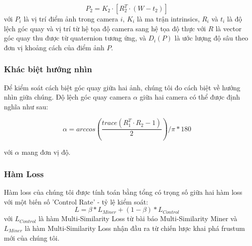 $$
P_2 = K_2 \cdot\left[R_2^{T} \cdot (W - t_2)\right]
$$
với $P_i$ là vị trí điểm ảnh trong camera $i$, $K_i$ là ma trận intrinsics, $R_i$ và $t_i$ là độ lệch góc quay và vị trí từ hệ tọa độ camera sang hệ tọa độ thực với $R$ là vector góc quay thu được từ quaternion tương ứng, và $D_i(P)$ là ước lượng độ sâu theo đơn vị khoảng cách của điểm ảnh $P$.

\subsubsection*{Khác biệt hướng nhìn}

Để kiểm soát cách biệt góc quay giữa hai ảnh, chúng tôi đo cách biệt về hướng nhìn giữa chúng. Độ lệch góc quay camera $\alpha$ giữa hai camera có thể được định nghĩa như sau:

$$
\alpha = arccos\left(\frac{trace(R_1^T \cdot R_2 - 1)}{2} \right) / \pi * 180
$$

với $\alpha$ mang đơn vị độ.

\subsubsection*{Hàm Loss}

Hàm loss của chúng tôi được tính toán bằng tổng có trọng số giữa hai hàm loss với một biến số 'Control Rate' - tỷ lệ kiểm soát:
$$
L = \beta * L_{Miner} + (1-\beta)*L_{Control}
$$
với $L_{Control}$ là hàm Multi-Similarity Loss từ bài báo Multi-Similarity Miner và $L_{Miner}$ là hàm Multi-Similarity Loss nhận đầu ra từ chiến lược khai phá frustum mới của chúng tôi. 
